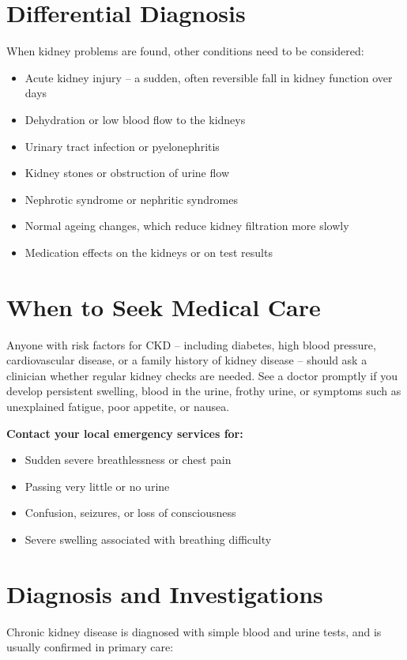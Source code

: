 \section*{Differential Diagnosis}
When kidney problems are found, other conditions need to be considered:

\begin{itemize}
    \item Acute kidney injury -- a sudden, often reversible fall in kidney function over days
    \item Dehydration or low blood flow to the kidneys
    \item Urinary tract infection or pyelonephritis
    \item Kidney stones or obstruction of urine flow
    \item Nephrotic syndrome or nephritic syndromes
    \item Normal ageing changes, which reduce kidney filtration more slowly
    \item Medication effects on the kidneys or on test results
\end{itemize}

\section*{When to Seek Medical Care}
Anyone with risk factors for CKD -- including diabetes, high blood pressure, cardiovascular disease, or a family history of kidney disease -- should ask a clinician whether regular kidney checks are needed. See a doctor promptly if you develop persistent swelling, blood in the urine, frothy urine, or symptoms such as unexplained fatigue, poor appetite, or nausea.

\textbf{Contact your local emergency services for:}
\begin{itemize}
    \item Sudden severe breathlessness or chest pain
    \item Passing very little or no urine
    \item Confusion, seizures, or loss of consciousness
    \item Severe swelling associated with breathing difficulty
\end{itemize}

\section*{Diagnosis and Investigations}
Chronic kidney disease is diagnosed with simple blood and urine tests, and is usually confirmed in primary care:

